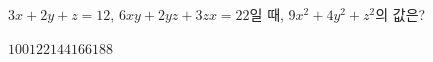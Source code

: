 $3x+2y+z=12$, $6xy+2yz+3zx=22$일 때, $9x^2+4y^2+z^2$의 값은?
\begin{choices32}{$100$}{$122$}{$144$}{$166$}{$188$}\end{choices32}
